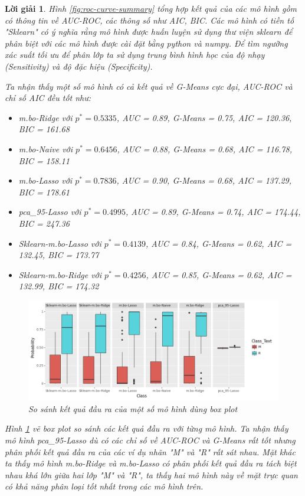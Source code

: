 \documentclass[14pt, a4paper]{article}
\theoremstyle{sltheorem}
\theoremstyle{soltheorem}
\newtheorem*{loigiai}{Lời giải}
\begin{document}
\begin{loigiai}
    Hình \ref{fig:roc-curve-summary} tổng hợp kết quả của các mô hình gồm có thông tin về AUC-ROC, các thông số như AIC, BIC.
    Các mô hình có tiền tố "Sklearn" có ý nghĩa rằng mô hình được huấn luyện sử dụng thư viện sklearn để phân biệt với các mô hình được cài đặt bằng python và numpy.
    Để tìm ngưỡng xác suất tối ưu để phân lớp ta sử dụng trung bình hình học của độ nhạy (Sensitivity) và độ đặc hiệu (Specificity).

    Ta nhận thấy một số mô hình có cả kết quả về G-Means cực đại, AUC-ROC và chỉ số AIC đều tốt như:

    \begin{itemize}
        \item m.bo-Ridge với $p^*=0.5335$, AUC = 0.89, G-Means = 0.75, AIC = 120.36, BIC = 161.68
        \item m.bo-Naive với $p^*=0.6456$, AUC = 0.88, G-Means = 0.68, AIC = 116.78, BIC = 158.11
        \item m.bo-Lasso với $p^*= 0.7836$, AUC = 0.90, G-Means = 0.68, AIC = 137.29, BIC = 178.61
        \item pca\_95-Lasso với $p^*= 0.4995$, AUC = 0.89, G-Means = 0.74, AIC = 174.44, BIC = 247.36
        \item Sklearn-m.bo-Lasso với $p^*= 0.4139$, AUC = 0.84, G-Means = 0.62, AIC = 132.45, BIC = 173.77
        \item Sklearn-m.bo-Ridge với $p^*= 0.4256$, AUC = 0.85, G-Means = 0.62, AIC = 132.99, BIC = 174.32
    \end{itemize}

    \begin{figure}[h!]
        \centering
        \includegraphics[width=1.0\textwidth]{figures/prob_box_plot.png}
        \caption{So sánh kết quả đầu ra của một số mô hình dùng box plot}
        \label{fig:prob-box-plot}
    \end{figure}

    Hình \ref{fig:prob-box-plot} vẽ box plot so sánh các kết quả đầu ra với từng mô hình.
    Ta nhận thấy mô hình pca\_95-Lasso dù có các chỉ số về AUC-ROC và G-Means rất tốt nhưng phân phối kết quả đầu ra của các ví dụ nhãn "M" và "R" rất sát nhau.
    Mặt khác ta thấy mô hình m.bo-Ridge và m.bo-Lasso có phân phối kết quả đầu ra tách biệt nhau khá lớn giữa hai lớp "M" và "R", ta thấy hai mô hình này về mặt trực quan có khả năng phân loại tốt nhất trong các mô hình trên.


\end{loigiai}
\end{document}
